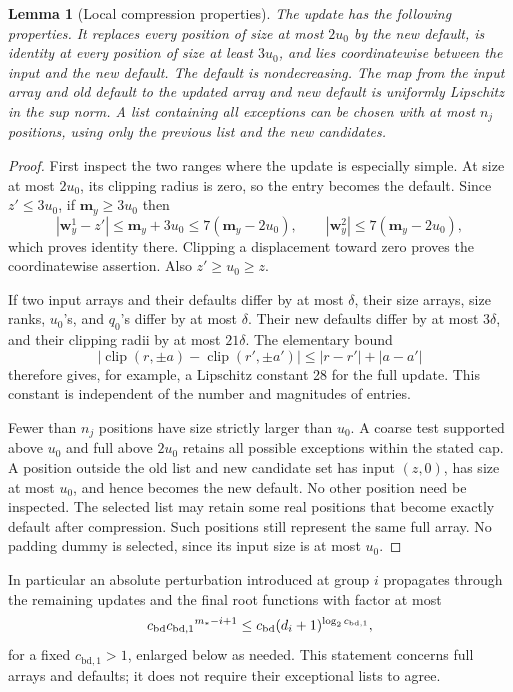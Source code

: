 \documentclass[11pt]{article}
\numberwithin{equation}{section}
\newtheorem{lemma}[theorem]{Lemma}
\theoremstyle{definition}
\theoremstyle{remark}
\begin{document}
\begin{lemma}[Local compression properties]
\label{lem:buf-update}
The update has the following properties.
It replaces every position of size at most $2u_0$ by the new default, is
identity at every position of size at least $3u_0$, and lies coordinatewise
between the input and the new default.  The default is nondecreasing.
The map from the input array and old default to the updated array and new
default is uniformly Lipschitz in the sup norm.  A list containing all
exceptions can be chosen with at most $n_j$ positions, using only the
previous list and the new candidates.
\end{lemma}
\begin{proof}
First inspect the two ranges where the update is especially simple. At size at most $2u_0$, its clipping radius is zero, so the entry becomes the default.  Since $z'\leq3u_0$, if ${\mathbf{m}}_y\geq3u_0$
then
\[
 |{\mathbf{w}}_y^1-z'|\leq {\mathbf{m}}_y+3u_0\leq7({\mathbf{m}}_y-2u_0),
 \qquad |{\mathbf{w}}_y^2|\leq7({\mathbf{m}}_y-2u_0),
\]
which proves identity there.  Clipping a displacement toward zero proves
the coordinatewise assertion.  Also $z'\geq u_0\geq z$.

If two input arrays and their defaults differ by at most $\delta$, their
size arrays, size ranks, $u_0$'s, and $q_0$'s differ by at most $\delta$.
Their new defaults differ by at most $3\delta$, and their clipping radii
by at most $21\delta$.  The elementary bound
\[
 |\operatorname{clip}(r,\pm {a})-\operatorname{clip}(r',\pm {a}')|
       \leq |r-r'|+|{a}-{a}'|
\]
therefore gives, for example, a Lipschitz constant 28 for the full update.
This constant is independent of the number and magnitudes of entries.

Fewer than $n_j$ positions have size strictly larger than $u_0$.
A coarse test supported above $u_0$ and full above $2u_0$ retains all
possible exceptions within the stated cap.  A position outside the old
list and new candidate set has input $(z,0)$, has size at most $u_0$,
and hence becomes the new default.  No other position need be inspected.
The selected list may retain some real positions that become exactly
default after compression.  Such positions still represent the same
full array.  No padding dummy is selected, since its input size is at
most $u_0$.
\end{proof}

In particular an absolute perturbation introduced at group $i$ propagates
through the remaining updates and the final root functions with factor
at most
\begin{equation}
 {c_{\rm bd}} {c_{\mathrm{bd},1}}^{m_*-i+1}
       \leq {c_{\rm bd}}(d_i+1)^{\log_2 {c_{\mathrm{bd},1}}},
 \label{eq:buf-propagation}
\end{equation}
for a fixed ${c_{\mathrm{bd},1}}>1$, enlarged below as needed.  This statement concerns
full arrays and defaults; it does not require their exceptional lists to
agree.
\end{document}
